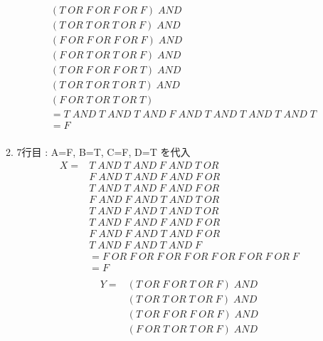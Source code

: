 \documentclass[dvipdfmx,10pt, a4j]{jarticle}
\theoremstyle{definition}
\begin{document}
\begin{enumerate}[i)]
\begin{enumerate}[1)]
\begin{align*}
                & (T\; OR\; F\; OR\; F\; OR\; F)\; AND\\
                & (T\; OR\; T\; OR\; T\; OR\; F)\; AND\\
                & (F\; OR\; F\; OR\; F\; OR\; F)\; AND\\
                & (F\; OR\; T\; OR\; T\; OR\; F)\; AND\\
                & (T\; OR\; F\; OR\; F\; OR\; T)\; AND\\
                & (T\; OR\; T\; OR\; T\; OR\; T)\; AND\\
                & (F\; OR\; T\; OR\; T\; OR\; T)\\
                &= T\; AND\; T\; AND\; T\; AND\; F\; AND\; T\; AND\; T\; AND\; T\; AND\; T\\
                &= F\\
            \end{align*}
            \item 7行目 : A=F, B=T, C=F, D=T を代入\\
            \begin{align*}
                X = &T\; AND\; T\; AND\; F\; AND\; T\; OR\\
                &F\; AND\; T\; AND\; F\; AND\; F\; OR\\
                &T\; AND\; T\; AND\; F\; AND\; F\; OR\\
                &F\; AND\; F\; AND\; T\; AND\; T\; OR\\
                &T\; AND\; F\; AND\; T\; AND\; T\; OR\\
                &T\; AND\; F\; AND\; F\; AND\; F\; OR\\
                &F\; AND\; F\; AND\; T\; AND\; F\; OR\\
                &T\; AND\; F\; AND\; T\; AND\; F\\
                &= F\; OR\; F\; OR\; F\; OR\; F\; OR\; F\; OR\; F\; OR\; F\; OR\; F\\
                &= F\\
            \end{align*}
            \begin{align*}
                Y = & (T\; OR\; F\; OR\; T\; OR\; F) \; AND\\
                & (T\; OR\; T\; OR\; T\; OR\; F)\; AND\\
                & (T\; OR\; F\; OR\; F\; OR\; F)\; AND\\
                & (F\; OR\; T\; OR\; T\; OR\; F)\; AND\\

\end{align*}
\end{enumerate}
\end{enumerate}
\end{document}
